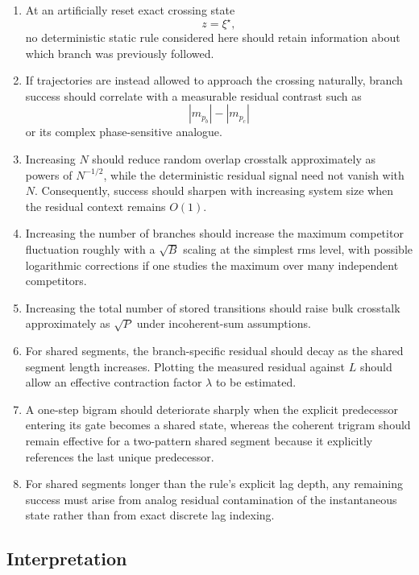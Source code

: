 \begin{enumerate}
\item At an artificially reset exact crossing state
\begin{equation}
z=\xi^\star,
\end{equation}
no deterministic static rule considered here should retain information
about which branch was previously followed.

\item If trajectories are instead allowed to approach the crossing
naturally, branch success should correlate with a measurable residual
contrast such as
\begin{equation}
    |m_{p_b}|-|m_{p_c}|
\end{equation}
or its complex phase-sensitive analogue.
\item Increasing $N$ should reduce random overlap crosstalk approximately
as powers of $N^{-1/2}$, while the deterministic residual signal need not
vanish with $N$.  Consequently, success should sharpen with increasing
system size when the residual context remains $O(1)$.
\item Increasing the number of branches should increase the maximum
competitor fluctuation roughly with a $\sqrt{B}$ scaling at the simplest
rms level, with possible logarithmic corrections if one studies the
maximum over many independent competitors.
\item Increasing the total number of stored transitions should raise bulk
crosstalk approximately as $\sqrt P$ under incoherent-sum assumptions.
\item For shared segments, the branch-specific residual should decay as the
shared segment length increases.  Plotting the measured residual against
$L$ should allow an effective contraction factor $\lambda$ to be estimated.
\item A one-step bigram should deteriorate sharply when the explicit
predecessor entering its gate becomes a shared state, whereas the coherent
trigram should remain effective for a two-pattern shared segment because it
explicitly references the last unique predecessor.
\item For shared segments longer than the rule's explicit lag depth, any
remaining success must arise from analog residual contamination of the
instantaneous state rather than from exact discrete lag indexing.

\end{enumerate}

\subsection{Interpretation}

